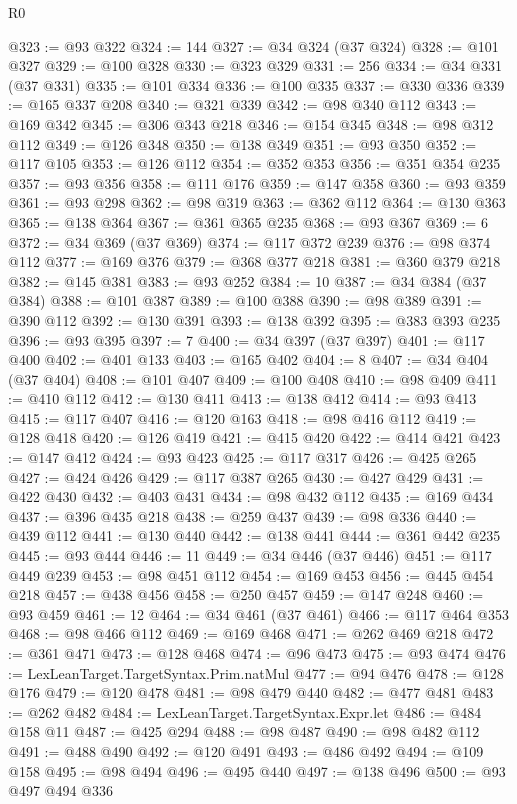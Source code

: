 \begin{lexlean}{R0}
\begin{coremodule}
@323 := @93 @322
@324 := 144
@327 := @34 @324 (@37 @324)
@328 := @101 @327
@329 := @100 @328
@330 := @323 @329
@331 := 256
@334 := @34 @331 (@37 @331)
@335 := @101 @334
@336 := @100 @335
@337 := @330 @336
@339 := @165 @337 @208
@340 := @321 @339
@342 := @98 @340 @112
@343 := @169 @342
@345 := @306 @343 @218
@346 := @154 @345
@348 := @98 @312 @112
@349 := @126 @348
@350 := @138 @349
@351 := @93 @350
@352 := @117 @105
@353 := @126 @112
@354 := @352 @353
@356 := @351 @354 @235
@357 := @93 @356
@358 := @111 @176
@359 := @147 @358
@360 := @93 @359
@361 := @93 @298
@362 := @98 @319
@363 := @362 @112
@364 := @130 @363
@365 := @138 @364
@367 := @361 @365 @235
@368 := @93 @367
@369 := 6
@372 := @34 @369 (@37 @369)
@374 := @117 @372 @239
@376 := @98 @374 @112
@377 := @169 @376
@379 := @368 @377 @218
@381 := @360 @379 @218
@382 := @145 @381
@383 := @93 @252
@384 := 10
@387 := @34 @384 (@37 @384)
@388 := @101 @387
@389 := @100 @388
@390 := @98 @389
@391 := @390 @112
@392 := @130 @391
@393 := @138 @392
@395 := @383 @393 @235
@396 := @93 @395
@397 := 7
@400 := @34 @397 (@37 @397)
@401 := @117 @400
@402 := @401 @133
@403 := @165 @402
@404 := 8
@407 := @34 @404 (@37 @404)
@408 := @101 @407
@409 := @100 @408
@410 := @98 @409
@411 := @410 @112
@412 := @130 @411
@413 := @138 @412
@414 := @93 @413
@415 := @117 @407
@416 := @120 @163
@418 := @98 @416 @112
@419 := @128 @418
@420 := @126 @419
@421 := @415 @420
@422 := @414 @421
@423 := @147 @412
@424 := @93 @423
@425 := @117 @317
@426 := @425 @265
@427 := @424 @426
@429 := @117 @387 @265
@430 := @427 @429
@431 := @422 @430
@432 := @403 @431
@434 := @98 @432 @112
@435 := @169 @434
@437 := @396 @435 @218
@438 := @259 @437
@439 := @98 @336
@440 := @439 @112
@441 := @130 @440
@442 := @138 @441
@444 := @361 @442 @235
@445 := @93 @444
@446 := 11
@449 := @34 @446 (@37 @446)
@451 := @117 @449 @239
@453 := @98 @451 @112
@454 := @169 @453
@456 := @445 @454 @218
@457 := @438 @456
@458 := @250 @457
@459 := @147 @248
@460 := @93 @459
@461 := 12
@464 := @34 @461 (@37 @461)
@466 := @117 @464 @353
@468 := @98 @466 @112
@469 := @169 @468
@471 := @262 @469 @218
@472 := @361 @471
@473 := @128 @468
@474 := @96 @473
@475 := @93 @474
@476 := LexLeanTarget.TargetSyntax.Prim.natMul
@477 := @94 @476
@478 := @128 @176
@479 := @120 @478
@481 := @98 @479 @440
@482 := @477 @481
@483 := @262 @482
@484 := LexLeanTarget.TargetSyntax.Expr.let
@486 := @484 @158 @11
@487 := @425 @294
@488 := @98 @487
@490 := @98 @482 @112
@491 := @488 @490
@492 := @120 @491
@493 := @486 @492
@494 := @109 @158
@495 := @98 @494
@496 := @495 @440
@497 := @138 @496
@500 := @93 @497 @494 @336

\end{coremodule}
\end{lexlean}
